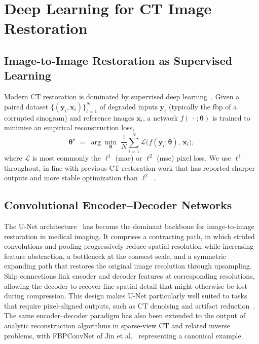 \section{Deep Learning for CT Image Restoration}
\label{sec:bg_dl_restoration}

\subsection{Image-to-Image Restoration as Supervised Learning}
\label{subsec:bg_supervised}

Modern CT restoration is dominated by supervised deep learning~\cite{LeCun2015, Sadia2024}. Given a paired dataset $\{(\boldsymbol{y}_{i},\boldsymbol{x}_{i})\}_{i=1}^{N}$ of degraded inputs $\boldsymbol{y}_{i}$ (typically the \gls{fbp} of a corrupted sinogram) and reference images $\boldsymbol{x}_{i}$, a network $f(\,\cdot\,;\boldsymbol{\theta})$ is trained to minimise an empirical reconstruction loss,
\begin{equation}
    \boldsymbol{\theta}^{\star}
    \;=\; \arg\min_{\boldsymbol{\theta}} \;
    \frac{1}{N}\sum_{i=1}^{N}
    \mathcal{L}\!\bigl(f(\boldsymbol{y}_{i};\boldsymbol{\theta}),\,\boldsymbol{x}_{i}\bigr),
    \label{eq:supervised_loss}
\end{equation}
where $\mathcal{L}$ is most commonly the $\ell^{1}$ (\gls{mae}) or $\ell^{2}$ (\gls{mse}) pixel loss. We use $\ell^{1}$ throughout, in line with previous CT restoration work that has reported sharper outputs and more stable optimization than $\ell^{2}$~\cite{Chen2017, Zhang2017}.

\subsection{Convolutional Encoder--Decoder Networks}
\label{subsec:bg_unet}

The U-Net architecture~\cite{Ronneberger2015} has become the dominant backbone for image-to-image restoration in medical imaging. It comprises a contracting path, in which strided convolutions and pooling progressively reduce spatial resolution while increasing feature abstraction, a bottleneck at the coarsest scale, and a symmetric expanding path that restores the original image resolution through upsampling. Skip connections link encoder and decoder features at corresponding resolutions, allowing the decoder to recover fine spatial detail that might otherwise be lost during compression. This design makes U-Net particularly well suited to tasks that require pixel-aligned outputs, such as CT denoising and artifact reduction~\cite{Komolafe2024, Zhang2023}. The same encoder--decoder paradigm has also been extended to the output of analytic reconstruction algorithms in sparse-view CT and related inverse problems, with FBPConvNet of Jin et al.~\cite{Jin2017} representing a canonical example.

